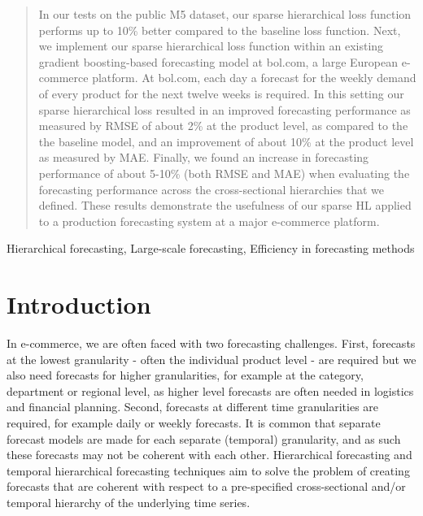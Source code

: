 \documentclass[preprint, 3p, times, twocolumn]{elsarticle}
\begin{document}
\begin{frontmatter}
\begin{abstract}
  In our tests on the public M5 dataset, our sparse hierarchical loss function performs up to 10\% better compared to the baseline loss function. Next, we implement our sparse hierarchical loss function within an existing gradient boosting-based forecasting model at bol.com, a large European e-commerce platform. At bol.com, each day a forecast for the weekly demand of every product for the next twelve weeks is required. In this setting our sparse hierarchical loss resulted in an improved forecasting performance as measured by RMSE of about 2\% at the product level, as compared to the the baseline model, and an improvement of about 10\% at the product level as measured by MAE. Finally, we found an increase in forecasting performance of about 5-10\% (both RMSE and MAE) when evaluating the forecasting performance across the cross-sectional hierarchies that we defined. These results demonstrate the usefulness of our sparse HL applied to a production forecasting system at a major e-commerce platform.

\end{abstract}

\begin{keyword}
  Hierarchical forecasting, Large-scale forecasting, Efficiency in forecasting methods
\end{keyword}

\end{frontmatter}

\section{Introduction} \label{sec:intro}
In e-commerce, we are often faced with two forecasting challenges. First, forecasts at the lowest granularity - often the individual product level - are required but we also need forecasts for higher granularities, for example at the category, department or regional level, as higher level forecasts are often needed in logistics and financial planning. Second, forecasts at different time granularities are required, for example daily or weekly forecasts. It is common that separate forecast models are made for each separate (temporal) granularity, and as such these forecasts may not be coherent with each other. Hierarchical forecasting \cite{hyndman_optimal_2011} and temporal hierarchical forecasting techniques \cite{athanasopoulos_forecasting_2017,rangapuram_coherent_2023,theodosiou_forecasting_2021} aim to solve the problem of creating forecasts that are coherent with respect to a pre-specified cross-sectional and/or temporal hierarchy of the underlying time series. 
\end{document}
